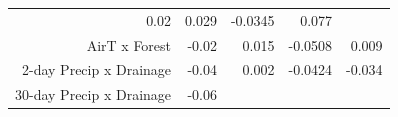 \begin{longtable}[c]{@{}rrrrr@{}}
\begin{minipage}[t]{0.08\columnwidth}
0.02
\strut\end{minipage} &
\begin{minipage}[t]{0.07\columnwidth}\raggedleft\strut
0.029
\strut\end{minipage} &
\begin{minipage}[t]{0.10\columnwidth}\raggedleft\strut
-0.0345
\strut\end{minipage} &
\begin{minipage}[t]{0.10\columnwidth}\raggedleft\strut
0.077
\strut\end{minipage}\tabularnewline
\begin{minipage}[t]{0.37\columnwidth}\raggedleft\strut
AirT x Forest
\strut\end{minipage} &
\begin{minipage}[t]{0.08\columnwidth}\raggedleft\strut
-0.02
\strut\end{minipage} &
\begin{minipage}[t]{0.07\columnwidth}\raggedleft\strut
0.015
\strut\end{minipage} &
\begin{minipage}[t]{0.10\columnwidth}\raggedleft\strut
-0.0508
\strut\end{minipage} &
\begin{minipage}[t]{0.10\columnwidth}\raggedleft\strut
0.009
\strut\end{minipage}\tabularnewline
\begin{minipage}[t]{0.37\columnwidth}\raggedleft\strut
2-day Precip x Drainage
\strut\end{minipage} &
\begin{minipage}[t]{0.08\columnwidth}\raggedleft\strut
-0.04
\strut\end{minipage} &
\begin{minipage}[t]{0.07\columnwidth}\raggedleft\strut
0.002
\strut\end{minipage} &
\begin{minipage}[t]{0.10\columnwidth}\raggedleft\strut
-0.0424
\strut\end{minipage} &
\begin{minipage}[t]{0.10\columnwidth}\raggedleft\strut
-0.034
\strut\end{minipage}\tabularnewline
\begin{minipage}[t]{0.37\columnwidth}\raggedleft\strut
30-day Precip x Drainage
\strut\end{minipage} &
\begin{minipage}[t]{0.08\columnwidth}\raggedleft\strut
-0.06
\strut\end{minipage} &

\end{longtable}
